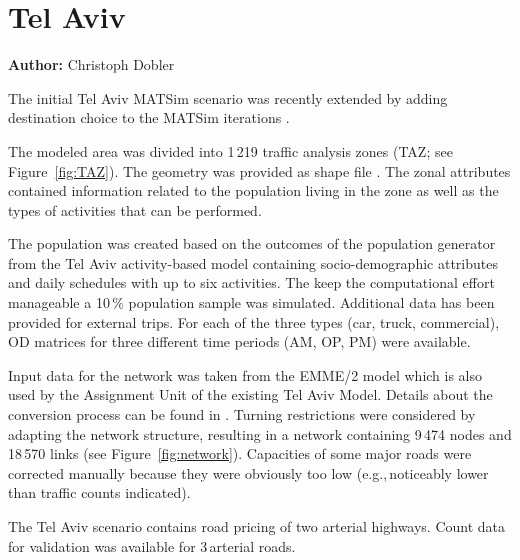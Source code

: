 \section{Tel Aviv}
\label{sec:telaviv}
\hfill \textbf{Author:} Christoph Dobler

The initial Tel Aviv MATSim scenario \citep[][]{BekhorEtAl_TRB_2011} was recently extended by adding destination choice to the MATSim iterations \citep[][]{DoblerEtAl_TechRep_IVT_2014}.

The modeled area was divided into 1\,219 traffic analysis zones (TAZ; see Figure~\ref{fig:TAZ}). The geometry was provided as shape file \citep{ESRI-ShapeFile_manual_1998}. The zonal attributes contained information related to the population living in the zone as well as the types of activities that can be performed.

The population was created based on the outcomes of the population generator from the Tel Aviv activity-based model containing socio-demographic attributes and daily schedules with up to six activities. The keep the computational effort manageable a 10\,\% population sample was simulated. Additional data has been provided for external trips. For each of the three types (car, truck, commercial), OD matrices for three different time periods (AM, OP, PM) were available.

Input data for the network was taken from the EMME/2 model \citep[see][]{EMME_Webpage_2011} which is also used by the Assignment Unit of the existing Tel Aviv Model. Details about the conversion process can be found in \citet{GaoWEtAl_TRR_2010}. Turning restrictions were considered by adapting the network structure, resulting in a network containing 9\,474 nodes and 18\,570 links (see Figure~\ref{fig:network}). Capacities of some major roads were corrected manually because they were obviously too low (e.g.,\,noticeably lower than traffic counts indicated).

The Tel Aviv scenario contains road pricing of two arterial highways. Count data for validation was available for 3\,arterial roads.

